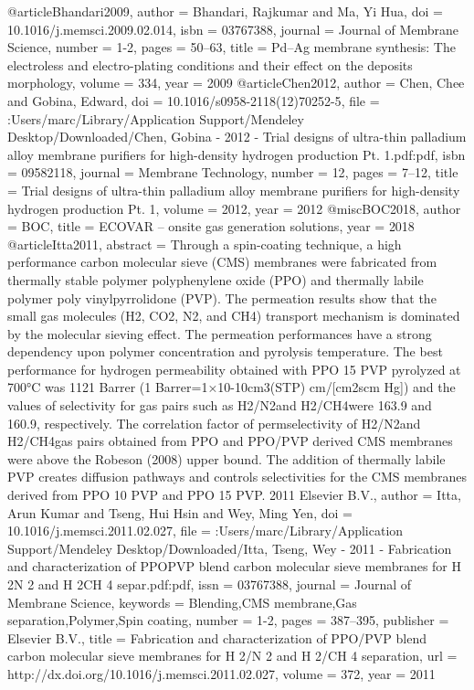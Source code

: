 @article{Bhandari2009,
author = {Bhandari, Rajkumar and Ma, Yi Hua},
doi = {10.1016/j.memsci.2009.02.014},
isbn = {03767388},
journal = {Journal of Membrane Science},
number = {1-2},
pages = {50--63},
title = {{Pd–Ag membrane synthesis: The electroless and electro-plating conditions and their effect on the deposits morphology}},
volume = {334},
year = {2009}
}
@article{Chen2012,
author = {Chen, Chee and Gobina, Edward},
doi = {10.1016/s0958-2118(12)70252-5},
file = {:Users/marc/Library/Application Support/Mendeley Desktop/Downloaded/Chen, Gobina - 2012 - Trial designs of ultra-thin palladium alloy membrane purifiers for high-density hydrogen production Pt. 1.pdf:pdf},
isbn = {09582118},
journal = {Membrane Technology},
number = {12},
pages = {7--12},
title = {{Trial designs of ultra-thin palladium alloy membrane purifiers for high-density hydrogen production Pt. 1}},
volume = {2012},
year = {2012}
}
@misc{BOC2018,
author = {BOC},
title = {{ECOVAR – onsite gas generation solutions}},
year = {2018}
}
@article{Itta2011,
abstract = {Through a spin-coating technique, a high performance carbon molecular sieve (CMS) membranes were fabricated from thermally stable polymer polyphenylene oxide (PPO) and thermally labile polymer poly vinylpyrrolidone (PVP). The permeation results show that the small gas molecules (H2, CO2, N2, and CH4) transport mechanism is dominated by the molecular sieving effect. The permeation performances have a strong dependency upon polymer concentration and pyrolysis temperature. The best performance for hydrogen permeability obtained with PPO 15 PVP pyrolyzed at 700°C was 1121 Barrer (1 Barrer=1×10-10cm3(STP) cm/[cm2scm Hg]) and the values of selectivity for gas pairs such as H2/N2and H2/CH4were 163.9 and 160.9, respectively. The correlation factor of permselectivity of H2/N2and H2/CH4gas pairs obtained from PPO and PPO/PVP derived CMS membranes were above the Robeson (2008) upper bound. The addition of thermally labile PVP creates diffusion pathways and controls selectivities for the CMS membranes derived from PPO 10 PVP and PPO 15 PVP. {\textcopyright} 2011 Elsevier B.V.},
author = {Itta, Arun Kumar and Tseng, Hui Hsin and Wey, Ming Yen},
doi = {10.1016/j.memsci.2011.02.027},
file = {:Users/marc/Library/Application Support/Mendeley Desktop/Downloaded/Itta, Tseng, Wey - 2011 - Fabrication and characterization of PPOPVP blend carbon molecular sieve membranes for H 2N 2 and H 2CH 4 separ.pdf:pdf},
issn = {03767388},
journal = {Journal of Membrane Science},
keywords = {Blending,CMS membrane,Gas separation,Polymer,Spin coating},
number = {1-2},
pages = {387--395},
publisher = {Elsevier B.V.},
title = {{Fabrication and characterization of PPO/PVP blend carbon molecular sieve membranes for H 2/N 2 and H 2/CH 4 separation}},
url = {http://dx.doi.org/10.1016/j.memsci.2011.02.027},
volume = {372},
year = {2011}
}
